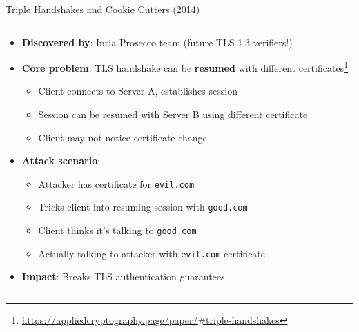 \documentclass[aspectratio=169, lualatex, handout]{beamer}
\begin{document}
\begin{frame}{Triple Handshakes and Cookie Cutters (2014)}
	\begin{columns}[c]
		\begin{column}{1\textwidth}
			\begin{itemize}
				\item \textbf{Discovered by}: Inria Prosecco team (future TLS 1.3 verifiers!)
				\item \textbf{Core problem}: TLS handshake can be \textbf{resumed} with different certificates\footnote{\url{https://appliedcryptography.page/paper/\#triple-handshakes}}
				      \begin{itemize}
					      \item Client connects to Server A, establishes session
					      \item Session can be resumed with Server B using different certificate
					      \item Client may not notice certificate change
				      \end{itemize}
				\item \textbf{Attack scenario}:
				      \begin{itemize}
					      \item Attacker has certificate for \texttt{evil.com}
					      \item Tricks client into resuming session with \texttt{good.com}
					      \item Client thinks it's talking to \texttt{good.com}
					      \item Actually talking to attacker with \texttt{evil.com} certificate
				      \end{itemize}
				\item \textbf{Impact}: Breaks TLS authentication guarantees
			\end{itemize}
		\end{column}
	\end{columns}
\end{frame}
\end{document}
